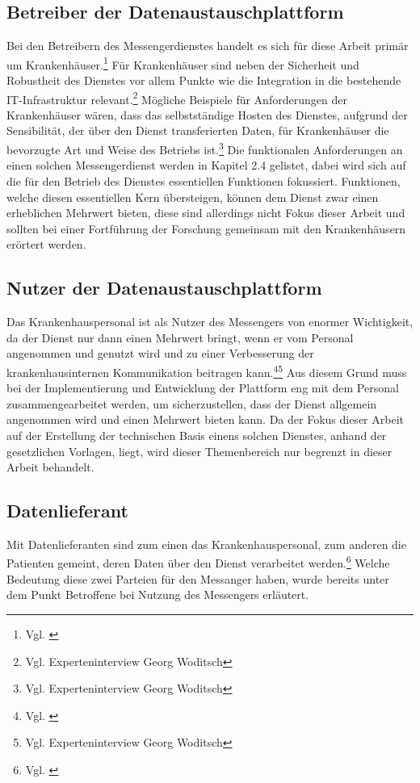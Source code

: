 \subsection{Betreiber der Datenaustauschplattform}\label{subsection:bdd}
Bei den Betreibern des Messengerdienstes handelt es sich für diese Arbeit primär um Krankenhäuser.\footnote{Vgl. \cite[S. 13]{Bundesverband-Gesundheits-IT-e.V.2016}} Für Krankenhäuser sind neben der Sicherheit und Robustheit des Dienstes vor allem Punkte wie die Integration in die bestehende IT-Infrastruktur relevant.\footnote{Vgl. Experteninterview Georg Woditsch}
Mögliche Beispiele für Anforderungen der Krankenhäuser wären, dass das selbstständige Hosten des Dienstes, aufgrund der Sensibilität, der über den Dienst transferierten Daten, für Krankenhäuser die bevorzugte Art und Weise des Betriebs ist.\footnote{Vgl. Experteninterview Georg Woditsch} Die funktionalen Anforderungen an einen solchen Messengerdienst werden in Kapitel 2.4 gelistet, dabei wird sich auf die für den Betrieb des Dienstes essentiellen Funktionen fokussiert. Funktionen, welche diesen essentiellen Kern übersteigen, können dem Dienst zwar einen erheblichen Mehrwert bieten, diese sind allerdings nicht Fokus dieser Arbeit und sollten bei einer Fortführung der Forschung gemeinsam mit den Krankenhäusern erörtert werden.

\subsection{Nutzer der Datenaustauschplattform}\label{subsection:ndd}
Das Krankenhauspersonal ist als Nutzer des Messengers von enormer Wichtigkeit, da der Dienst nur dann einen Mehrwert bringt, wenn er vom Personal angenommen und genutzt wird und zu einer Verbesserung der krankenhausinternen Kommunikation beitragen kann.\footnote{Vgl. \cite[S. 13]{Bundesverband-Gesundheits-IT-e.V.2016}}\footnote{Vgl. Experteninterview Georg Woditsch} Aus diesem Grund muss bei der Implementierung und Entwicklung der Plattform eng mit dem Personal zusammengearbeitet werden, um sicherzustellen, dass der Dienst allgemein angenommen wird und einen Mehrwert bieten kann. Da der Fokus dieser Arbeit auf der Erstellung der technischen Basis einens solchen Dienstes, anhand der gesetzlichen Vorlagen, liegt, wird dieser Themenbereich nur begrenzt in dieser Arbeit behandelt. 

\subsection{Datenlieferant}\label{subsection:hdd}
Mit Datenlieferanten sind zum einen das Krankenhauspersonal, zum anderen die Patienten gemeint, deren Daten über den Dienst verarbeitet werden.\footnote{Vgl. \cite[S. 13]{Bundesverband-Gesundheits-IT-e.V.2016}} Welche Bedeutung diese zwei Parteien für den Messanger haben, wurde bereits unter dem Punkt \glqq Betroffene bei Nutzung des Messengers\grqq{} erläutert.

